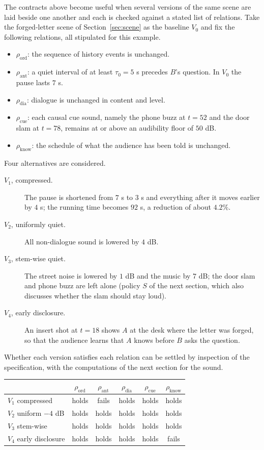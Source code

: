 The contracts above become useful when several versions of the same scene are laid beside one another and each is checked against a stated list of relations. Take the forged-letter scene of Section~\ref{sec:scene} as the baseline $V_0$ and fix the following relations, all stipulated for this example.
\begin{itemize}
\item $\rho_{\mathrm{ord}}$: the sequence of history events is unchanged.
\item $\rho_{\mathrm{ant}}$: a quiet interval of at least $\tau_0=5$ s precedes $B$'s question. In $V_0$ the pause lasts $7$ s.
\item $\rho_{\mathrm{dia}}$: dialogue is unchanged in content and level.
\item $\rho_{\mathrm{cue}}$: each causal cue sound, namely the phone buzz at $t=52$ and the door slam at $t=78$, remains at or above an audibility floor of $50$ dB.
\item $\rho_{\mathrm{know}}$: the schedule of what the audience has been told is unchanged.
\end{itemize}
Four alternatives are considered.
\begin{description}
\item[$V_1$, compressed.] The pause is shortened from $7$ s to $3$ s and everything after it moves earlier by $4$ s; the running time becomes $92$ s, a reduction of about $4.2\%$.
\item[$V_2$, uniformly quiet.] All non-dialogue sound is lowered by $4$ dB.
\item[$V_3$, stem-wise quiet.] The street noise is lowered by $1$ dB and the music by $7$ dB; the door slam and phone buzz are left alone (policy $S$ of the next section, which also discusses whether the slam should stay loud).
\item[$V_4$, early disclosure.] An insert shot at $t=18$ shows $A$ at the desk where the letter was forged, so that the audience learns that $A$ knows before $B$ asks the question.
\end{description}
Whether each version satisfies each relation can be settled by inspection of the specification, with the computations of the next section for the sound.

\begin{center}
\begin{tabular}{lccccc}
\toprule
 & $\rho_{\mathrm{ord}}$ & $\rho_{\mathrm{ant}}$ & $\rho_{\mathrm{dia}}$ & $\rho_{\mathrm{cue}}$ & $\rho_{\mathrm{know}}$\\
\midrule
$V_1$ compressed & holds & fails & holds & holds & holds\\
$V_2$ uniform $-4$ dB & holds & holds & holds & holds & holds\\
$V_3$ stem-wise & holds & holds & holds & holds & holds\\
$V_4$ early disclosure & holds & holds & holds & holds & fails\\
\bottomrule
\end{tabular}
\end{center}

